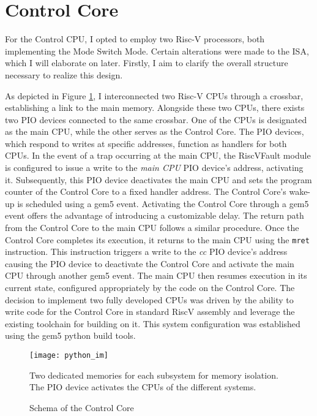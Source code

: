 \section{Control Core}
For the Control CPU, I opted to employ two Risc-V processors, both implementing
the Mode Switch Mode. Certain alterations were made to the ISA, which I will
elaborate on later. Firstly, I aim to clarify the overall structure necessary to
realize this design.\par 
As depicted in Figure \ref{fig:python_im}, I interconnected two Risc-V CPUs
through a crossbar, establishing a link to the main memory. Alongside these two
CPUs, there exists two PIO devices connected to the same crossbar. One of the CPUs is
designated as the main CPU, while the other serves as the Control Core. The PIO
devices, which respond to writes at specific addresses, function as handlers for
both CPUs. In the event of a trap occurring at the main CPU, the RiscVFault
module is configured to issue a write to the \emph{main CPU} PIO device's address, activating
it. Subsequently, this PIO device deactivates the main CPU and sets the program
counter of the Control Core to a fixed handler address. The Control Core's
wake-up is scheduled using a gem5 event. Activating the Control Core through a
gem5 event offers the advantage of introducing a customizable delay. The return
path from the Control Core to the main CPU follows a similar procedure. Once the
Control Core completes its execution, it returns to the main CPU using the \texttt{mret}
instruction. This instruction triggers a write to the \emph{cc} PIO device's address
causing the PIO device to deactivate the Control Core and activate
the main CPU through another gem5 event. The main CPU then resumes execution in
its current state, configured appropriately by the code on the Control Core.
The decision to implement two fully developed CPUs was driven by the ability to
write code for the Control Core in standard RiscV assembly and leverage the
existing toolchain for building on it. This system configuration was established
using the gem5 python build tools.\par

\begin{figure}[h]
    \centering
    \texttt{[image: python\_im]}
    \captionsetup{justification=centering}
    \caption{Schema of the Control Core}
        Two dedicated memories for each subsystem for memory isolation. The PIO
        device activates the CPUs of the different systems.
    \label{fig:python_im}
\end{figure}

